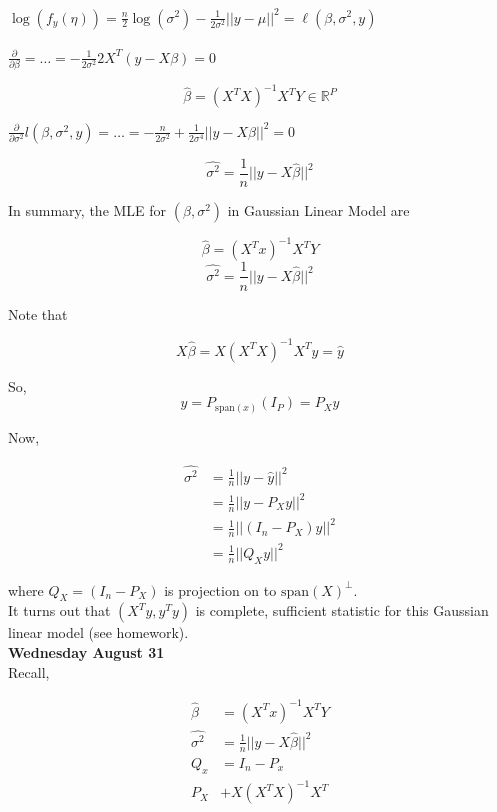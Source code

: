\documentclass[11pt,fleqn]{book} %
\begin{document}
$\log(f_y(\eta)) = \frac{n}{2} \log(\sigma^2) -\frac{1}{2\sigma^2} ||y - \mu ||^2 = \ell(\beta, \sigma^2, y)$\\
\\

$\frac{\partial}{\partial \beta} = \dots = -\frac{1}{2 \sigma^2} 2 X^T (y - X\beta) = 0 $

$$\hat{\beta} = (X^T X)^{-1} X^T Y \in \mathbb{R}^P$$

$\frac{\partial}{\partial \sigma^2} l(\beta, \sigma^2, y) = \dots = -\frac{n}{2\sigma^2} + \frac{1}{2 \sigma^4} ||y - X\beta ||^2 = 0 $

$$\hat{\sigma^2} = \frac{1}{n} ||y-X\hat{\beta}||^2 $$

In summary, the MLE for $(\beta, \sigma^2)$ in Gaussian Linear Model are

$$\hat{\beta} = (X^T x)^{-1} X^T Y $$
$$\hat{\sigma^2} = \frac{1}{n} ||y-X\hat{\beta}||^2 $$

Note that 

$$X\hat{\beta} = X(X^T X)^{-1} X^T y = \hat{y}$$

So, 
$$\hat{y} = P_{\text{span}(x)} (I_P) = P_X y$$

Now, 

\begin{align*}
	\hat{\sigma^2} &= \frac{1}{n} ||y - \hat{y}||^2\\
	&= \frac{1}{n} ||y - P_X y||^2\\
	&= \frac{1}{n} ||(I_n - P_X) y||^2 \\
	&= \frac{1}{n} ||Q_X y ||^2
\end{align*}


where $Q_X = (I_n - P_X)$ is projection on to $\text{span}(X)^\perp$.\\

It turns out that $(X^T y, y^T y)$ is complete, sufficient statistic for this Gaussian linear model (see homework). \\


\textbf{Wednesday August 31}\\ 

Recall,

\begin{align*}
	\hat{\beta} &= (X^T x)^{-1} X^T Y\\
	\hat{\sigma^2} &= \frac{1}{n} ||y-X\hat{\beta}||^2\\
	Q_x &= I_n - P_x\\
	P_X &+ X(X^TX)^{-1}X^T
\end{align*}
\end{document}
